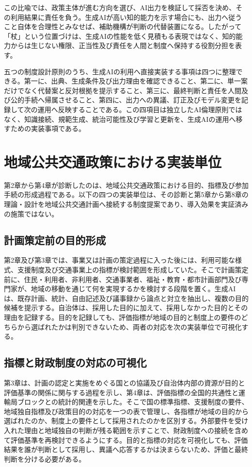 この比喩では、政策主体が進む方向を選び、AI出力を検証して採否を決め、その利用結果に責任を負う。生成AIが高い知的能力を示す場合にも、出力へ従うこと自体を合理性とみなせば、補助機構が判断の代替装置になる。したがって「杖」という位置づけは、生成AIの性能を低く見積もる表現ではなく、知的能力からは生じない権限、正当性及び責任を人間と制度へ保持する役割分担を表す。

五つの制度設計原則のうち、生成AIの利用へ直接実装する事項は四つに整理できる。第一に、出典、生成条件及び出力理由を確認できること、第二に、単一案だけでなく代替案と反対根拠を提示すること、第三に、最終判断と責任を人間及び公的手続へ帰属させること、第四に、出力への異議、訂正及びモデル変更を記録して次の運用へ反映することである。この四項目は独立したAI倫理原則ではなく、知識接続、規範生成、統治可能性及び学習と更新を、生成AIの運用へ移すための実装事項である。

\section{地域公共交通政策における実装単位}
\label{sec:ch9_transport_units}

第2章から第4章が診断したのは、地域公共交通政策における目的、指標及び参加手続の形成過程である。以下の四つの実装単位は、その診断と第5章から第8章の理論・設計を地域公共交通計画へ接続する制度提案であり、導入効果を実証済みの施策ではない。

\subsection{計画策定前の目的形成}

第2章及び第3章では、事業又は計画の策定過程に入った後には、利用可能な様式、支援制度及び交通事業上の指標が検討範囲を形成していた。そこで計画策定前に、住民・利用者、非利用者、交通事業者、福祉・教育・都市計画部門及び専門家が、地域の移動を通じて何を実現するかを検討する段階を置く。生成AIは、既存計画、統計、自由記述及び議事録から論点と対立を抽出し、複数の目的候補を提示する。自治体は、採用した目的に加えて、採用しなかった目的とその理由を記録する。目的を記録しても、評価指標が地域の目的と制度上の要件のどちらから選ばれたかは判別できないため、両者の対応を次の実装単位で可視化する。

\subsection{指標と財政制度の対応の可視化}

第3章は、計画の認定と実施をめぐる国との協議及び自治体内部の資源が目的と評価基準の関係に関与する過程を示し、第4章は、評価指標の全国的共通性と運輸局ブロックとの統計的関連を示した。そこで国の標準指標、支援制度の要件、地域独自指標及び政策目的の対応を一つの表で管理し、各指標が地域の目的から選ばれたのか、制度上の要件として採用されたのかを区別する。外部要件を受け入れた理由と地域独自の判断が残る範囲を示すことで、財政制度への接続を含めて評価基準を再検討できるようにする。目的と指標の対応を可視化しても、評価結果を誰が判断として採用し、異議へ応答するかは決まらないため、評価と最終判断を分ける必要がある。

